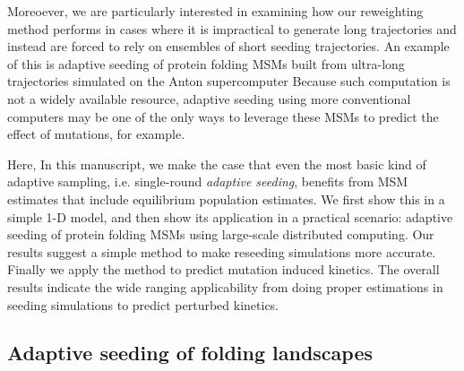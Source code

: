 \documentclass[%
 aip,
rsi,%
 amsmath,amssymb,
 reprint,%
]{revtex4-1}
\begin{document}
Moreoever, we are particularly interested in examining how our reweighting method performs in cases where it is impractical to generate long trajectories and instead are forced to rely on ensembles of short seeding trajectories. An example of this is adaptive seeding of protein folding MSMs built from ultra-long trajectories simulated on the Anton supercomputer\cite{DESRES}  Because such computation is not a widely available resource, adaptive seeding using more conventional computers may be one of the only ways to leverage these MSMs to predict the effect of mutations, for example. 

Here, 
In this manuscript, we make the case that even the most basic kind of adaptive sampling, i.e. single-round \textit{adaptive seeding}, benefits from MSM estimates that include equilibrium population estimates.  We first show this in a simple 1-D model, and then show its application in a practical scenario: adaptive seeding of protein folding MSMs using large-scale distributed computing. Our results suggest a simple method to make reseeding simulations more accurate. Finally we apply the method to predict mutation induced kinetics. The overall results indicate the wide ranging applicability from doing proper estimations in seeding simulations to predict perturbed kinetics. 

\subsection{\label{sec:level2}Adaptive seeding of folding landscapes}
\end{document}
